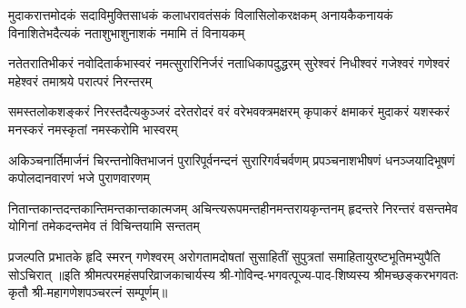 
\fourlineindentedshloka
{मुदाकरात्तमोदकं सदाविमुक्तिसाधकं}
{कलाधरावतंसकं विलासिलोकरक्षकम्}
{अनायकैकनायकं विनाशितेभदैत्यकं}
{नताशुभाशुनाशकं नमामि तं विनायकम्}

\fourlineindentedshloka
{नतेतरातिभीकरं नवोदितार्कभास्वरं}
{नमत्सुरारिनिर्जरं नताधिकापदुद्धरम्}
{सुरेश्वरं निधीश्वरं गजेश्वरं गणेश्वरं}
{महेश्वरं तमाश्रये परात्परं निरन्तरम्}

\fourlineindentedshloka
{समस्तलोकशङ्करं निरस्तदैत्यकुञ्जरं}
{दरेतरोदरं वरं वरेभवक्त्रमक्षरम्}
{कृपाकरं क्षमाकरं मुदाकरं यशस्करं}
{मनस्करं नमस्कृतां नमस्करोमि भास्वरम्}

\fourlineindentedshloka
{अकिञ्चनार्तिमार्जनं चिरन्तनोक्तिभाजनं}
{पुरारिपूर्वनन्दनं सुरारिगर्वचर्वणम्}
{प्रपञ्चनाशभीषणं धनञ्जयादिभूषणं}
{कपोलदानवारणं भजे पुराणवारणम्}

\fourlineindentedshloka
{नितान्तकान्तदन्तकान्तिमन्तकान्तकात्मजम्}
{अचिन्त्यरूपमन्तहीनमन्तरायकृन्तनम्}
{हृदन्तरे निरन्तरं वसन्तमेव योगिनां}
{तमेकदन्तमेव तं विचिन्तयामि सन्ततम्}

{प्रजल्पति प्रभातके हृदि स्मरन् गणेश्वरम्}
{अरोगतामदोषतां सुसाहितीं सुपुत्रतां}
{समाहितायुरष्टभूतिमभ्युपैति सोऽचिरात्}
॥इति श्रीमत्परमहंसपरिव्राजकाचार्यस्य श्री-गोविन्द-भगवत्पूज्य-पाद-शिष्यस्य
श्रीमच्छङ्करभगवतः कृतौ श्री-महागणेशपञ्चरत्नं सम्पूर्णम्॥